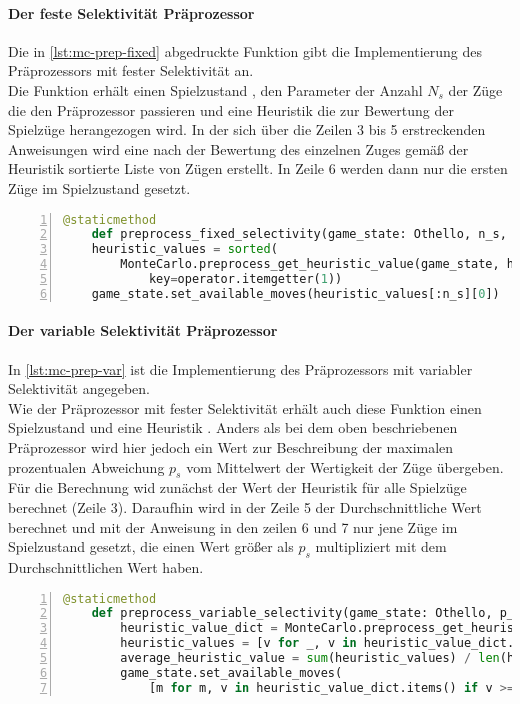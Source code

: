 \paragraph{Der feste Selektivität Präprozessor}
Die in \ref{lst:mc-prep-fixed} abgedruckte Funktion gibt die Implementierung des Präprozessors mit fester Selektivität an.
\\Die Funktion erhält einen Spielzustand , den Parameter  der Anzahl $N_{s}$ der Züge die den Präprozessor passieren und eine Heuristik  die zur Bewertung der Spielzüge herangezogen wird. In der sich über die Zeilen 3 bis 5 erstreckenden Anweisungen wird eine nach der Bewertung des einzelnen Zuges gemäß der Heuristik sortierte Liste von Zügen erstellt. In Zeile 6 werden dann nur die ersten  Züge im Spielzustand  gesetzt.
\begin{lstlisting}[caption = {Die Funktion \code{preprocess\_fixed\_slectivity}}, language = python, captionpos = t , numbers=left, label={lst:mc-prep-fixed}]
	@staticmethod	    
	def preprocess_fixed_selectivity(game_state: Othello, n_s, heuristic):
    heuristic_values = sorted(
        MonteCarlo.preprocess_get_heuristic_value(game_state, heuristic=heuristic).items(),
            key=operator.itemgetter(1))
    game_state.set_available_moves(heuristic_values[:n_s][0])
\end{lstlisting}
\paragraph{Der variable Selektivität Präprozessor}
In \ref{lst:mc-prep-var} ist die Implementierung des Präprozessors mit variabler Selektivität angegeben.
\\Wie der Präprozessor mit fester Selektivität erhält auch diese Funktion einen Spielzustand  und eine Heuristik . Anders als bei dem oben beschriebenen Präprozessor wird hier jedoch ein Wert  zur Beschreibung der maximalen prozentualen Abweichung $p_{s}$ vom Mittelwert der Wertigkeit der Züge übergeben.
\\Für die Berechnung wid zunächst der Wert der Heuristik für alle Spielzüge berechnet (Zeile 3). Daraufhin wird in der Zeile 5 der Durchschnittliche Wert berechnet und mit der Anweisung in den zeilen 6 und 7 nur jene Züge im Spielzustand gesetzt, die einen Wert größer als $p_{s}$ multipliziert mit dem Durchschnittlichen Wert haben.
\begin{lstlisting}[caption = {Die Funktion \code{preprocess\_variable\_slectivity}}, language = python, captionpos = t , numbers=left, label={lst:mc-prep-var}]
	@staticmethod
    def preprocess_variable_selectivity(game_state: Othello, p_s, heuristic):
        heuristic_value_dict = MonteCarlo.preprocess_get_heuristic_value(game_state, heuristic=heuristic)
        heuristic_values = [v for _, v in heuristic_value_dict.items()]
        average_heuristic_value = sum(heuristic_values) / len(heuristic_values)
        game_state.set_available_moves(
            [m for m, v in heuristic_value_dict.items() if v >= p_s * average_heuristic_value])
\end{lstlisting}
